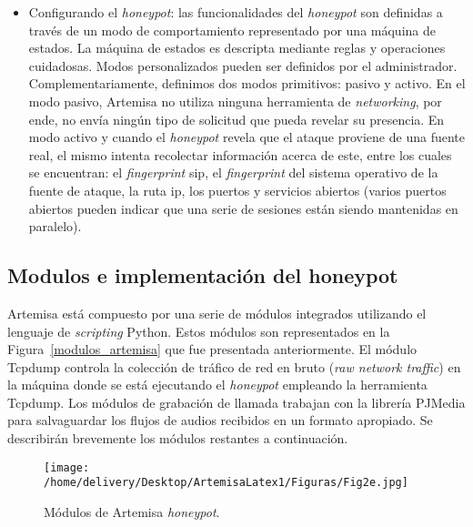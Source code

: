 \documentclass[a4paper,12pt]{report}
\begin{document}
\begin{itemize}
\item Configurando el \emph{honeypot}:
las funcionalidades del \emph{honeypot} son definidas a través de un modo de
comportamiento representado por una máquina de estados. La máquina de estados
es descripta mediante reglas y operaciones cuidadosas. Modos personalizados
pueden ser definidos por el administrador. Complementariamente, definimos dos
modos primitivos: pasivo y activo. En el modo pasivo, Artemisa no utiliza
ninguna herramienta de \emph{networking}, por ende, no envía ningún tipo de solicitud
que pueda revelar su presencia. En modo activo y cuando el \emph{honeypot} revela que
el ataque proviene de una fuente real, el mismo intenta recolectar información
acerca de este, entre los cuales se encuentran: el \emph{fingerprint} \ac{sip}, el \emph{fingerprint} del sistema
operativo de la fuente de ataque, la ruta \ac{ip}, los puertos y servicios abiertos
(varios puertos abiertos pueden indicar que una serie de sesiones están siendo
mantenidas en paralelo).  
\end{itemize}


\subsection{Modulos e implementación del honeypot}
\label{modulos_arte}

Artemisa está compuesto por una serie de módulos integrados utilizando el
lenguaje de \emph{scripting} Python. Estos módulos son representados en la Figura~\ref{modulos_artemisa}
que fue presentada anteriormente.
El módulo Tcpdump controla la colección de tráfico de red en bruto (\emph{raw
network traffic}) en la máquina donde se está ejecutando el \emph{honeypot} empleando
la herramienta \mbox{Tcpdump}. Los módulos de grabación de llamada trabajan con la
librería PJMedia para salvaguardar los flujos de audios recibidos en un formato
apropiado. Se describirán brevemente los módulos restantes a continuación. 

\begin{figure}[h!] 
\centering
\texttt{[image: /home/delivery/Desktop/ArtemisaLatex1/Figuras/Fig2e.jpg]}
\caption{Módulos de Artemisa \emph{honeypot}. \cite{docarmof}}
\label{digrama_flujo_artemisa}
\end{figure}
\end{document}

